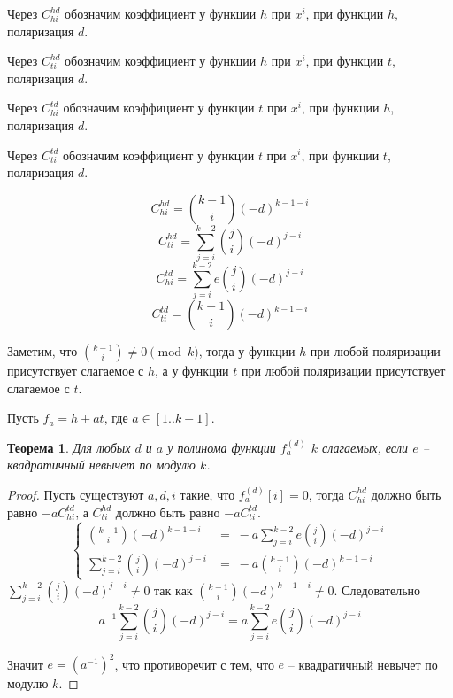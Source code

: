 \documentclass[bibliography=totoc, a4paper, 12pt]{extarticle}
\newtheorem{myth}{Теорема}
\begin{document}
Через $C^{hd}_{hi}$ обозначим коэффициент у функции $h$ при $x^i$, при
функции $h$, поляризация $d$.

Через $C^{hd}_{ti}$ обозначим коэффициент у функции $h$ при $x^i$, при
функции $t$, поляризация $d$.

Через $C^{td}_{hi}$ обозначим коэффициент у функции $t$ при $x^i$, при
функции $h$, поляризация $d$.

Через $C^{td}_{ti}$ обозначим коэффициент у функции $t$ при $x^i$, при
функции $t$, поляризация $d$.

\[ C^{hd}_{hi} = \binom{k-1}{i}(-d)^{k-1-i} \]
\[ C^{hd}_{ti} = \sum_{j=i}^{k-2} \binom{j}{i}(-d)^{j-i} \]
\[ C^{td}_{hi} = \sum_{j=i}^{k-2} e \binom{j}{i}(-d)^{j-i} \]
\[ C^{td}_{ti} = \binom{k-1}{i}(-d)^{k-1-i} \]

Заметим, что $\binom{k-1}{i} \neq 0 \pmod k$, тогда у функции $h$ при любой
поляризации присутствует слагаемое с $h$, а у функции $t$ при любой поляризации
присутствует слагаемое с $t$.

Пусть $f_a = h + at$, где $a \in [1 .. k-1]$.

\begin{myth}
    Для любых $d$ и $a$ у полинома функции $f^{(d)}_a$ $k$ слагаемых, если $e$
    -- квадратичный невычет по модулю $k$.
\end{myth}
\begin{proof}
    Пусть существуют $a, d, i$ такие, что $f^{(d)}_a[i] = 0$, тогда
    $C^{hd}_{hi}$ должно быть равно $-a C^{td}_{hi}$, а $C^{hd}_{ti}$ должно
    быть равно $-a C^{td}_{ti}$.
    \begin{equation*}
        \begin{cases}
            \binom{k-1}{i}(-d)^{k-1-i} & = \;
                -a \sum\limits_{j=i}^{k-2} e \binom{j}{i} (-d)^{j-i} \\
            \sum\limits_{j=i}^{k-2} \binom{j}{i} (-d)^{j-i} & = \;
                -a \binom{k-1}{i}(-d)^{k-1-i}
        \end{cases}
    \end{equation*}
    $\sum\limits_{j=i}^{k-2} \binom{j}{i} (-d)^{j-i} \neq 0$ так как
    $\binom{k-1}{i}(-d)^{k-1-i} \neq 0$.
    Следовательно
    \[
        a^{-1} \sum_{j=i}^{k-2} \binom{j}{i} (-d)^{j-i} =
            a \sum_{j=i}^{k-2} e \binom{j}{i} (-d)^{j-i}
    \]

    Значит $e = (a^{-1})^2$, что противоречит с тем, что $e$ -- квадратичный
    невычет по модулю $k$.
\end{proof}
\end{document}
